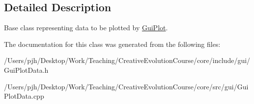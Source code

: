 \subsection{Detailed Description}
Base class representing data to be plotted by \hyperlink{class_gui_plot}{Gui\-Plot}. 

The documentation for this class was generated from the following files\-:\begin{DoxyCompactItemize}
\item 
/\-Users/pjh/\-Desktop/\-Work/\-Teaching/\-Creative\-Evolution\-Course/core/include/gui/Gui\-Plot\-Data.\-h\item 
/\-Users/pjh/\-Desktop/\-Work/\-Teaching/\-Creative\-Evolution\-Course/core/src/gui/Gui\-Plot\-Data.\-cpp\end{DoxyCompactItemize}
